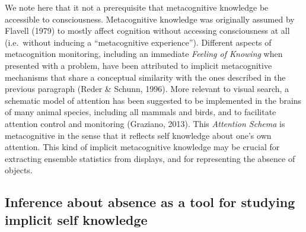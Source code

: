 \documentclass[
  english,
  man]{apa6}
\begin{document}
We note here that it not a prerequisite that metacognitive knowledge be accessible to consciousness. Metacognitive knowledge was originally assumed by Flavell (1979) to mostly affect cognition without accessing consciousness at all (i.e.~without inducing a \enquote{metacognitive experience}). Different aspects of metacognition monitoring, including an immediate \emph{Feeling of Knowing} when presented with a problem, have been attributed to implicit metacognitive mechanisms that share a conceptual similarity with the ones described in the previous paragraph (Reder \& Schunn, 1996). More relevant to visual search, a schematic model of attention has been suggested to be implemented in the brains of many animal species, including all mammals and birds, and to facilitate attention control and monitoring (Graziano, 2013). This \emph{Attention Schema} is metacognitive in the sense that it reflects self knowledge about one's own attention. This kind of implicit metacognitive knowledge may be crucial for extracting ensemble statistics from displays, and for representing the absence of objects.

\hypertarget{inference-about-absence-as-a-tool-for-studying-implicit-self-knowledge}{%
\subsection{Inference about absence as a tool for studying implicit self knowledge}\label{inference-about-absence-as-a-tool-for-studying-implicit-self-knowledge}}
\end{document}
